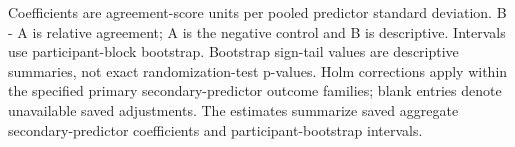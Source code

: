 \noindent\footnotesize Coefficients are agreement-score units per pooled predictor standard deviation. B - A is relative agreement; A is the negative control and B is descriptive. Intervals use participant-block bootstrap. Bootstrap sign-tail values are descriptive summaries, not exact randomization-test p-values. Holm corrections apply within the specified primary secondary-predictor outcome families; blank entries denote unavailable saved adjustments. The estimates summarize saved aggregate secondary-predictor coefficients and participant-bootstrap intervals.
\endgroup
